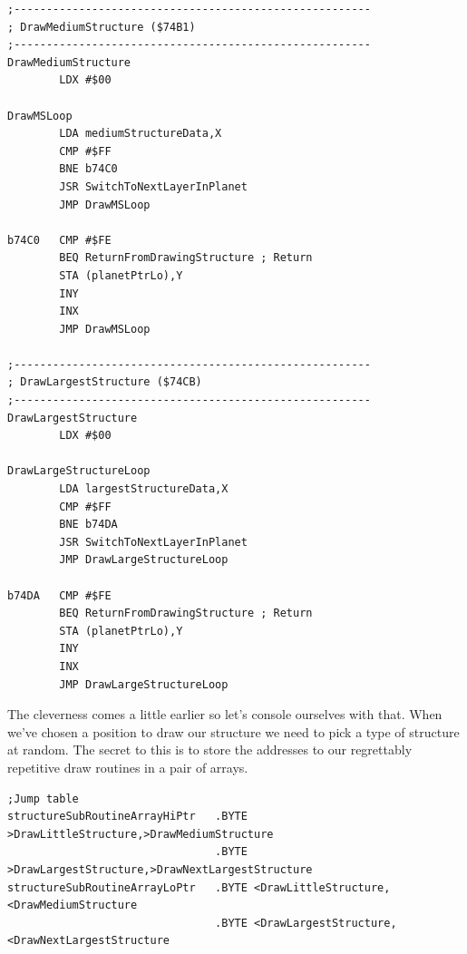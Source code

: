 \begin{lstlisting}[caption=\icode{DrawMediumStructure} and \icode{DrawLargestStructure} are identical to each other\, and to
\icode{DrawLittleStructure} and \icode{DrawNextLargestStructure}.]
;-------------------------------------------------------
; DrawMediumStructure ($74B1)
;-------------------------------------------------------
DrawMediumStructure
        LDX #$00

DrawMSLoop
        LDA mediumStructureData,X
        CMP #$FF
        BNE b74C0
        JSR SwitchToNextLayerInPlanet
        JMP DrawMSLoop

b74C0   CMP #$FE
        BEQ ReturnFromDrawingStructure ; Return
        STA (planetPtrLo),Y
        INY
        INX
        JMP DrawMSLoop

;-------------------------------------------------------
; DrawLargestStructure ($74CB)
;-------------------------------------------------------
DrawLargestStructure
        LDX #$00

DrawLargeStructureLoop
        LDA largestStructureData,X
        CMP #$FF
        BNE b74DA
        JSR SwitchToNextLayerInPlanet
        JMP DrawLargeStructureLoop

b74DA   CMP #$FE
        BEQ ReturnFromDrawingStructure ; Return
        STA (planetPtrLo),Y
        INY
        INX
        JMP DrawLargeStructureLoop
\end{lstlisting}

The cleverness comes a little earlier so let's console ourselves with that. When we've chosen a position to draw
our structure we need to pick a type of structure at random. The secret to this is to store the addresses to our
regrettably repetitive draw routines in a pair of arrays. 


\begin{lstlisting}[caption=A 'jump table' containing the addresses to our draw routines. The address for \icode{DrawLittleStructure} 
happens to be \$7486\, so we store \$74 in the first byte of \icode{structureSubRoutineArrayHiPtr} and \$86 in the first
byte of \icode{structureSubRoutineArrayLoPtr}.,basicstyle=\tiny]
;Jump table
structureSubRoutineArrayHiPtr   .BYTE >DrawLittleStructure,>DrawMediumStructure
                                .BYTE >DrawLargestStructure,>DrawNextLargestStructure
structureSubRoutineArrayLoPtr   .BYTE <DrawLittleStructure,<DrawMediumStructure
                                .BYTE <DrawLargestStructure,<DrawNextLargestStructure
\end{lstlisting}


